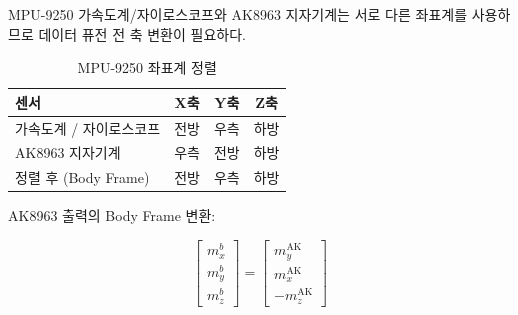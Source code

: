 MPU-9250 가속도계/자이로스코프와 AK8963 지자기계는
서로 다른 좌표계를 사용하므로 데이터 퓨전 전 축 변환이 필요하다.
 
\begin{table}[H]
    \centering
    \caption{MPU-9250 좌표계 정렬}
    \label{tab:axis_align}
    \begin{tabular}{lccc}
        \toprule
        센서 & X축 & Y축 & Z축 \\
        \midrule
        가속도계 / 자이로스코프 & 전방 & 우측 & 하방 \\
        AK8963 지자기계 & 우측 & 전방 & 하방 \\
        \midrule
        정렬 후 (Body Frame) & 전방 & 우측 & 하방 \\
        \bottomrule
    \end{tabular}
\end{table}
 
AK8963 출력의 Body Frame 변환:
 
\begin{equation}
    \begin{bmatrix} m_x^b \\ m_y^b \\ m_z^b \end{bmatrix} =
    \begin{bmatrix} m_y^{\text{AK}} \\ m_x^{\text{AK}} \\ -m_z^{\text{AK}} \end{bmatrix}
    \tag{D.5}
\end{equation}
